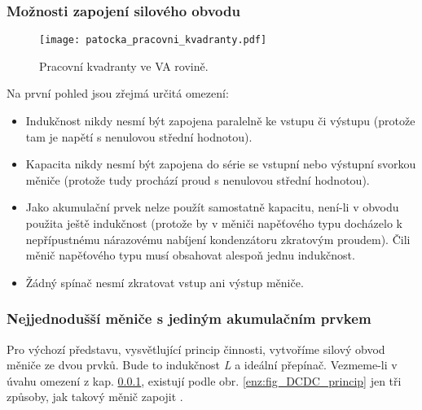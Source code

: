       \subsubsection{Možnosti zapojení silového obvodu}\label{enz_kap_moznosti_zapojeni}
         \begin{figure}
           \centering
           \texttt{[image: patocka\_pracovni\_kvadranty.pdf]}
           \caption{Pracovní kvadranty ve VA rovině.}
           \label{enz:fig_prac_kvadranty}
         \end{figure}
         Na první pohled jsou zřejmá určitá omezení:
         \begin{itemize}
       	   \item Indukčnost nikdy nesmí být zapojena paralelně ke vstupu či výstupu (protože tam je
                 napětí s nenulovou střední hodnotou).
           \item Kapacita nikdy nesmí být zapojena do série se vstupní nebo výstupní svorkou měniče
                 (protože tudy prochází proud s nenulovou střední hodnotou).
           \item Jako akumulační prvek nelze použít samostatně kapacitu, není-li v obvodu použita
                 ještě indukčnost (protože by v měniči napěťového typu docházelo k nepřípustnému
                 nárazovému nabíjení kondenzátoru zkratovým proudem). Čili měnič napěťového typu
                 musí obsahovat alespoň jednu indukčnost.
           \item Žádný spínač nesmí zkratovat vstup ani výstup měniče.
         \end{itemize}
      \subsubsection{Nejjednodušší měniče s jediným akumulačním 
                     prvkem}\label{ENZ:tit_menice_s_1_aku_prvkem} 
         Pro výchozí představu, vysvětlující princip činnosti, vytvoříme silový obvod měniče ze
         dvou prvků. Bude to indukčnost  \emph{L} a ideální přepínač. Vezmeme-li v úvahu omezení z
         kap. \ref{enz_kap_moznosti_zapojeni}, existují podle obr. \ref{enz:fig_DCDC_princip} jen
         tři způsoby, jak takový měnič zapojit \cite{Patocka}.

